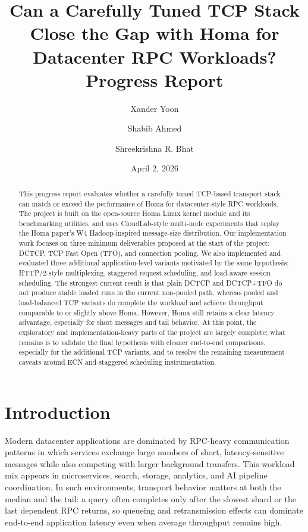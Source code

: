 \documentclass[11pt]{article}
\title{\textbf{Can a Carefully Tuned TCP Stack Close the Gap with Homa for Datacenter RPC Workloads?}\\
\large Progress Report}
\author{
Xander Yoon \and Shabib Ahmed \and Shreekrishna R. Bhat
}
\date{April 2, 2026}
\begin{document}
\maketitle

\begin{abstract}
This progress report evaluates whether a carefully tuned TCP-based transport stack can match or exceed the performance of Homa for datacenter-style RPC workloads. The project is built on the open-source Homa Linux kernel module and its benchmarking utilities, and uses CloudLab-style multi-node experiments that replay the Homa paper's W4 Hadoop-inspired message-size distribution. Our implementation work focuses on three minimum deliverables proposed at the start of the project: DCTCP, TCP Fast Open (TFO), and connection pooling. We also implemented and evaluated three additional application-level variants motivated by the same hypothesis: HTTP/2-style multiplexing, staggered request scheduling, and load-aware session scheduling. The strongest current result is that plain DCTCP and DCTCP+TFO do not produce stable loaded runs in the current non-pooled path, whereas pooled and load-balanced TCP variants do complete the workload and achieve throughput comparable to or slightly above Homa. However, Homa still retains a clear latency advantage, especially for short messages and tail behavior. At this point, the exploratory and implementation-heavy parts of the project are largely complete; what remains is to validate the final hypothesis with cleaner end-to-end comparisons, especially for the additional TCP variants, and to resolve the remaining measurement caveats around ECN and staggered scheduling instrumentation.
\end{abstract}

\section{Introduction}

Modern datacenter applications are dominated by RPC-heavy communication patterns in which services exchange large numbers of short, latency-sensitive messages while also competing with larger background transfers. This workload mix appears in microservices, search, storage, analytics, and AI pipeline coordination. In such environments, transport behavior matters at both the median and the tail: a query often completes only after the slowest shard or the last dependent RPC returns, so queueing and retransmission effects can dominate end-to-end application latency even when average throughput remains high.
\end{document}
